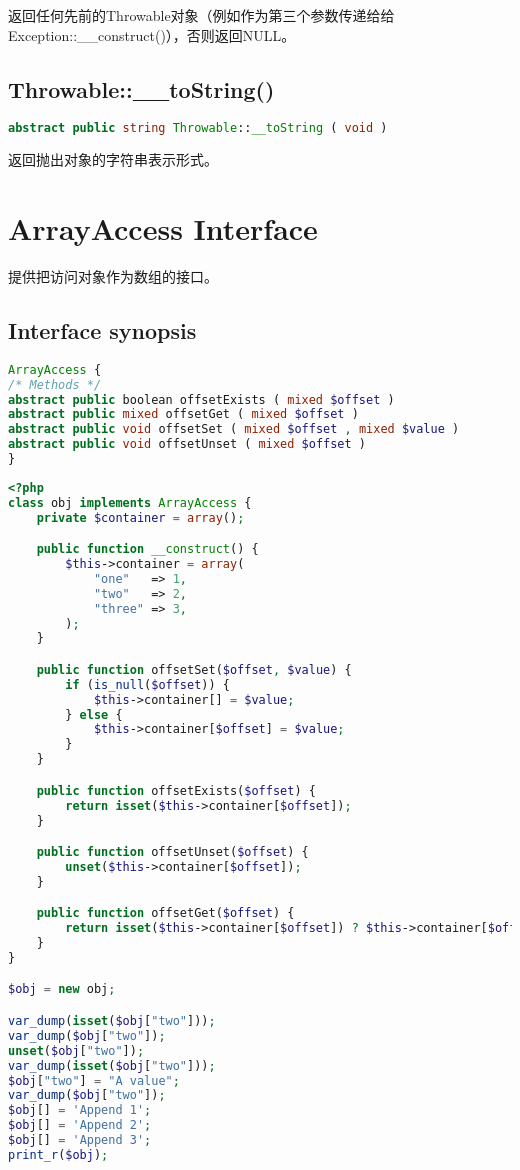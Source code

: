 返回任何先前的Throwable对象（例如作为第三个参数传递给给Exception::\_\_construct()），否则返回NULL。


\section{Throwable::\_\_toString()}

\begin{lstlisting}[language=PHP]
abstract public string Throwable::__toString ( void )
\end{lstlisting}


返回抛出对象的字符串表示形式。






\chapter{ArrayAccess Interface}

提供把访问对象作为数组的接口。

\section{Interface synopsis}


\begin{lstlisting}[language=PHP]
ArrayAccess {
/* Methods */
abstract public boolean offsetExists ( mixed $offset )
abstract public mixed offsetGet ( mixed $offset )
abstract public void offsetSet ( mixed $offset , mixed $value )
abstract public void offsetUnset ( mixed $offset )
}
\end{lstlisting}


\begin{lstlisting}[language=PHP]
<?php
class obj implements ArrayAccess {
    private $container = array();

    public function __construct() {
        $this->container = array(
            "one"   => 1,
            "two"   => 2,
            "three" => 3,
        );
    }

    public function offsetSet($offset, $value) {
        if (is_null($offset)) {
            $this->container[] = $value;
        } else {
            $this->container[$offset] = $value;
        }
    }

    public function offsetExists($offset) {
        return isset($this->container[$offset]);
    }

    public function offsetUnset($offset) {
        unset($this->container[$offset]);
    }

    public function offsetGet($offset) {
        return isset($this->container[$offset]) ? $this->container[$offset] : null;
    }
}

$obj = new obj;

var_dump(isset($obj["two"]));
var_dump($obj["two"]);
unset($obj["two"]);
var_dump(isset($obj["two"]));
$obj["two"] = "A value";
var_dump($obj["two"]);
$obj[] = 'Append 1';
$obj[] = 'Append 2';
$obj[] = 'Append 3';
print_r($obj);
\end{lstlisting}

